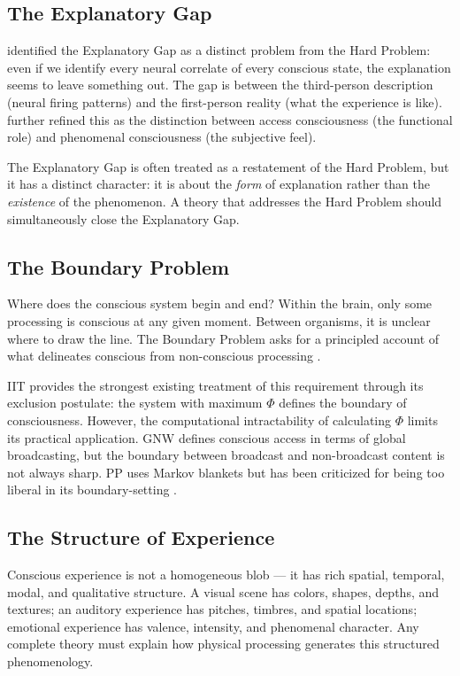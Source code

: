 \documentclass[12pt]{article}
\begin{document}
\subsection{The Explanatory Gap}


\citet{Levine1983} identified the Explanatory Gap as a distinct problem from the Hard Problem: even if we identify every neural correlate of every conscious state, the explanation seems to leave something out. The gap is between the third-person description (neural firing patterns) and the first-person reality (what the experience is like). \citet{Block1995,Block2007} further refined this as the distinction between access consciousness (the functional role) and phenomenal consciousness (the subjective feel).

The Explanatory Gap is often treated as a restatement of the Hard Problem, but it has a distinct character: it is about the \emph{form} of explanation rather than the \emph{existence} of the phenomenon. A theory that addresses the Hard Problem should simultaneously close the Explanatory Gap.


\subsection{The Boundary Problem}


Where does the conscious system begin and end? Within the brain, only some processing is conscious at any given moment. Between organisms, it is unclear where to draw the line. The Boundary Problem asks for a principled account of what delineates conscious from non-conscious processing \citep[see][]{Bayne2010,Tononi2004}.

IIT provides the strongest existing treatment of this requirement through its exclusion postulate: the system with maximum $\Phi$ defines the boundary of consciousness. However, the computational intractability of calculating $\Phi$ limits its practical application. GNW defines conscious access in terms of global broadcasting, but the boundary between broadcast and non-broadcast content is not always sharp. PP uses Markov blankets \citep{Friston2010} but has been criticized for being too liberal in its boundary-setting \citep{Bruineberg2022}.


\subsection{The Structure of Experience}


Conscious experience is not a homogeneous blob --- it has rich spatial, temporal, modal, and qualitative structure. A visual scene has colors, shapes, depths, and textures; an auditory experience has pitches, timbres, and spatial locations; emotional experience has valence, intensity, and phenomenal character. Any complete theory must explain how physical processing generates this structured phenomenology.
\end{document}
